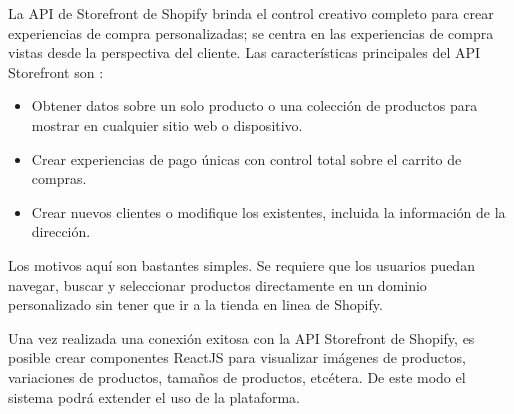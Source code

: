 La API de Storefront de Shopify brinda el control creativo completo para crear experiencias de compra personalizadas; se centra en las experiencias de compra vistas desde la perspectiva del cliente. Las características principales del API Storefront son \cite{storefront}:
\begin{itemize}
  \item Obtener datos sobre un solo producto o una colección de productos para mostrar en cualquier sitio web o dispositivo.
  \item Crear experiencias de pago únicas con control total sobre el carrito de compras.
  \item Crear nuevos clientes o modifique los existentes, incluida la información de la dirección.
\end{itemize}
Los motivos aquí son bastantes simples. Se requiere que los usuarios puedan navegar, buscar y seleccionar productos directamente en un dominio personalizado sin tener que ir a la tienda en linea de Shopify.
\vspace{0.8cm}

Una vez realizada una conexión exitosa con la API Storefront de Shopify, es posible crear componentes ReactJS para visualizar imágenes de productos, variaciones de productos, tamaños de productos, etcétera. De este modo el sistema podrá extender el uso de la plataforma.

\newpage
